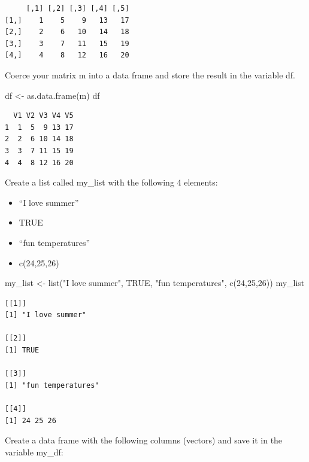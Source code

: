 \documentclass[
  letterpaper,
  DIV=11,
  numbers=noendperiod]{scrartcl}
\newenvironment{Shaded}{\begin{snugshade}}{\end{snugshade}}
\newcommand{\ConstantTok}[1]{\textcolor[rgb]{0.56,0.35,0.01}{#1}}
\newcommand{\DecValTok}[1]{\textcolor[rgb]{0.68,0.00,0.00}{#1}}
\newcommand{\FunctionTok}[1]{\textcolor[rgb]{0.28,0.35,0.67}{#1}}
\newcommand{\NormalTok}[1]{\textcolor[rgb]{0.00,0.23,0.31}{#1}}
\newcommand{\OtherTok}[1]{\textcolor[rgb]{0.00,0.23,0.31}{#1}}
\newcommand{\StringTok}[1]{\textcolor[rgb]{0.13,0.47,0.30}{#1}}
\begin{document}
\begin{verbatim}
     [,1] [,2] [,3] [,4] [,5]
[1,]    1    5    9   13   17
[2,]    2    6   10   14   18
[3,]    3    7   11   15   19
[4,]    4    8   12   16   20
\end{verbatim}

Coerce your matrix m into a data frame and store the result in the
variable df.

\begin{Shaded}
\begin{Highlighting}[]
\NormalTok{df }\OtherTok{\textless{}{-}} \FunctionTok{as.data.frame}\NormalTok{(m)}
\NormalTok{df}
\end{Highlighting}
\end{Shaded}

\begin{verbatim}
  V1 V2 V3 V4 V5
1  1  5  9 13 17
2  2  6 10 14 18
3  3  7 11 15 19
4  4  8 12 16 20
\end{verbatim}

Create a list called my\_list with the following 4 elements:

\begin{itemize}
\item
  ``I love summer''
\item
  TRUE
\item
  ``fun temperatures''
\item
  c(24,25,26)
\end{itemize}

\begin{Shaded}
\begin{Highlighting}[]
\NormalTok{my\_list }\OtherTok{\textless{}{-}} \FunctionTok{list}\NormalTok{(}\StringTok{"I love summer"}\NormalTok{, }\ConstantTok{TRUE}\NormalTok{, }\StringTok{"fun temperatures"}\NormalTok{, }\FunctionTok{c}\NormalTok{(}\DecValTok{24}\NormalTok{,}\DecValTok{25}\NormalTok{,}\DecValTok{26}\NormalTok{))}
\NormalTok{my\_list}
\end{Highlighting}
\end{Shaded}

\begin{verbatim}
[[1]]
[1] "I love summer"

[[2]]
[1] TRUE

[[3]]
[1] "fun temperatures"

[[4]]
[1] 24 25 26
\end{verbatim}

Create a data frame with the following columns (vectors) and save it in
the variable my\_df:
\end{document}
